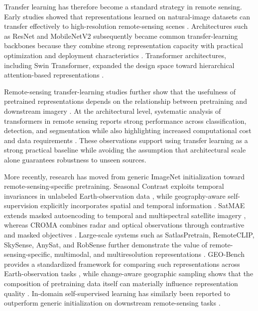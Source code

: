 Transfer learning has therefore become a standard strategy in remote sensing. Early studies showed that representations learned on natural-image datasets can transfer effectively to high-resolution remote-sensing scenes \cite{hu2015transfercnn,nogueira2017convnets}. Architectures such as ResNet and MobileNetV2 subsequently became common transfer-learning backbones because they combine strong representation capacity with practical optimization and deployment characteristics \cite{he2016resnet,sandler2018mobilenetv2}. Transformer architectures, including Swin Transformer, expanded the design space toward hierarchical attention-based representations \cite{liu2021swin}.

Remote-sensing transfer-learning studies further show that the usefulness of pretrained representations depends on the relationship between pretraining and downstream imagery \cite{ma2024transfer}. At the architectural level, systematic analysis of transformers in remote sensing reports strong performance across classification, detection, and segmentation while also highlighting increased computational cost and data requirements \cite{wang2024transformersurvey}. These observations support using transfer learning as a strong practical baseline while avoiding the assumption that architectural scale alone guarantees robustness to unseen sources.


More recently, research has moved from generic ImageNet initialization toward remote-sensing-specific pretraining. Seasonal Contrast exploits temporal invariances in unlabeled Earth-observation data \cite{manas2021seco}, while geography-aware self-supervision explicitly incorporates spatial and temporal information \cite{ayush2021geoaware}. SatMAE extends masked autoencoding to temporal and multispectral satellite imagery \cite{cong2022satmae}, whereas CROMA combines radar and optical observations through contrastive and masked objectives \cite{fuller2023croma}. Large-scale systems such as SatlasPretrain, RemoteCLIP, SkySense, AnySat, and RobSense further demonstrate the value of remote-sensing-specific, multimodal, and multiresolution representations \cite{bastani2023satlaspretrain,liu2024remoteclip,guo2024skysense,astruc2025anysat,do2025robsense}. GEO-Bench provides a standardized framework for comparing such representations across Earth-observation tasks \cite{lacoste2023geobench}, while change-aware geographic sampling shows that the composition of pretraining data itself can materially influence representation quality \cite{mall2023caco}. In-domain self-supervised learning has similarly been reported to outperform generic initialization on downstream remote-sensing tasks \cite{dimitrovski2024indomainssl}.

